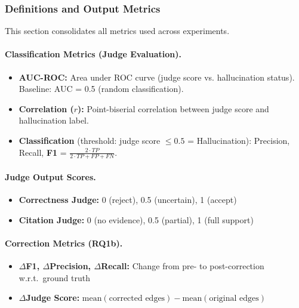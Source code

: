 \subsubsection{Definitions and Output Metrics}
\label{sec:metrics_definitions}

This section consolidates all metrics used across experiments.

\paragraph{Classification Metrics (Judge Evaluation).}
\begin{itemize}[noitemsep]
    \item \textbf{AUC-ROC:} Area under ROC curve (judge score vs. hallucination status). Baseline: AUC = 0.5 (random classification).
    \item \textbf{Correlation ($r$):} Point-biserial correlation between judge score and hallucination label.
    \item \textbf{Classification} (threshold: judge score $\leq 0.5$ = Hallucination): Precision, Recall, \textbf{F1} = $\frac{2 \cdot TP}{2 \cdot TP + FP + FN}$.
\end{itemize}

\paragraph{Judge Output Scores.}
\begin{itemize}[noitemsep]
    \item \textbf{Correctness Judge:} 0 (reject), 0.5 (uncertain), 1 (accept)
    \item \textbf{Citation Judge:} 0 (no evidence), 0.5 (partial), 1 (full support)
\end{itemize}

\paragraph{Correction Metrics (RQ1b).}
\begin{itemize}[noitemsep]
    \item \textbf{$\Delta$F1, $\Delta$Precision, $\Delta$Recall:} Change from pre- to post-correction w.r.t.\ ground truth
    \item \textbf{$\Delta$Judge Score:} $\text{mean}(\text{corrected edges}) - \text{mean}(\text{original edges})$
\end{itemize}

